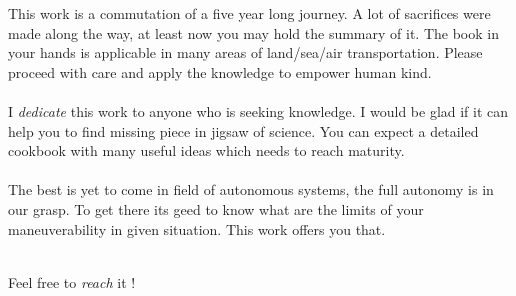 \noindent This work is a commutation of a five year long journey. A lot of sacrifices were made along the way, at least now you may hold the summary of it. The book in your hands is applicable in many areas of land/sea/air transportation. Please proceed with care and apply the knowledge to empower human kind.  
\\ \\
I \emph{dedicate} this work to anyone who is seeking knowledge. I would be glad if it can help you to find missing piece in jigsaw of science. You can expect a detailed cookbook with many useful ideas which needs to reach maturity. 
\\\\
The best is yet to come in field of autonomous systems, the full autonomy is in our grasp. To get there its geed to know what are the limits of your maneuverability in given situation. This work offers you that.
\\ 
\\
\begin{flushright}
Feel free to \emph{reach} it !
\end{flushright}